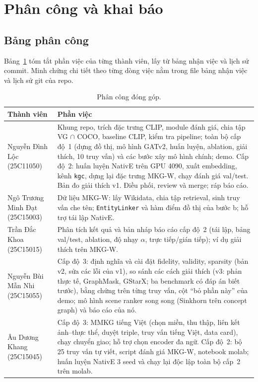 \section*{Phân công và khai báo}

\subsection*{Bảng phân công}

Bảng~\ref{tab:contrib} tóm tắt phần việc của từng thành viên, lấy từ bảng nhận việc  và lịch sử
commit. Minh chứng chi tiết theo từng dòng việc nằm trong file bảng nhận việc và lịch sử git của repo.

\begin{table}[t]
\centering
\caption{Phân công đóng góp.}
\label{tab:contrib}
\footnotesize
\begin{tabular}{p{3.6cm}p{13.2cm}}
\toprule
Thành viên & Phần việc \\
\midrule
Nguyễn Đình Lộc (25C11050) &
Khung repo, trích đặc trưng CLIP, module đánh giá, chia tập VG $\cap$ COCO, baseline CLIP, kiểm tra pipeline; toàn bộ cấp
độ~1 (dựng đồ thị, mô hình GATv2, huấn luyện, ablation, giải thích, 10 truy vấn) và các bước xây mô hình chính; demo. Cấp
độ~2: huấn luyện NativE trên GPU 4090, xuất embedding, kênh \texttt{kgc}, dựng lại đặc trưng MKG-W, chạy đánh giá val/test.
Bản đo giải thích v1. Điều phối, review và merge; ráp báo cáo. \\
Ngô Trương Minh Đạt (25C15003) &
Dữ liệu MKG-W: lấy Wikidata, chia tập retrieval, sinh truy vấn che tên; \texttt{EntityLinker} và hàm điểm đồ thị của bước b;
hỗ trợ tái lập NativE. \\
Trần Đắc Khoa (25C15015) &
Phân tích kết quả và bản nháp báo cáo cấp độ~2 (tái lập, bảng val/test, ablation, độ nhạy $\alpha$, trực tiếp/gián tiếp);
ví dụ giải thích trên MKG-W. \\
Nguyễn Bùi Mẫn Nhi (25C15055) &
Cấp độ~3: định nghĩa và cài đặt fidelity, validity, sparsity (bản v2, sửa các lỗi của v1), so sánh các cách giải thích
(v3: phản thực tế, GraphMask, GStarX; ba benchmark có đáp án biết trước),
bằng chứng trên từng truy vấn, cột ``bỏ phần này'' của demo; mô hình scene ranker song song (Sinkhorn trên concept graph)
và báo cáo của nó. \\
Âu Dương Khang (25C15045) &
Cấp độ~3: MMKG tiếng Việt (chọn miền, thu thập, liên kết ảnh--thực thể, duyệt triple, truy vấn tiếng Việt, data card),
chạy chuyển giao; hỗ trợ chọn encoder đa ngữ. Cấp độ~2: bộ 25 truy vấn tự viết, script đánh giá MKG-W, notebook molab;
huấn luyện NativE 3 seed và chạy lại độc lập toàn bộ cấp~2 trên molab. \\
\bottomrule
\end{tabular}
\end{table}

